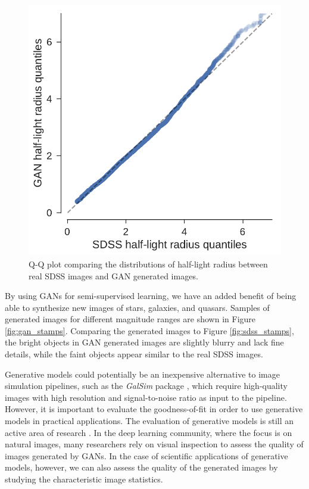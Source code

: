 \documentclass[fleqn,usenatbib]{mnras}
\begin{document}
\begin{figure}
  \centering
  \includegraphics[width=\columnwidth]{figures/size_qq.pdf}
  \caption{Q-Q plot comparing the distributions of half-light radius between real SDSS images and GAN generated images.}
  \label{fig:size_qq}
\end{figure}

By using GANs for semi-supervised learning, we have an added benefit of being able to synthesize
new images of stars, galaxies, and quasars.
Samples of generated images for different magnitude ranges are shown in Figure \ref{fig:gan_stamps}.
Comparing the generated images to Figure \ref{fig:sdss_stamps}, the bright objects in GAN generated images are
slightly blurry and lack fine details, while the faint objects appear similar to the real SDSS images.

Generative models could potentially be an inexpensive alternative to
image simulation pipelines, such as the \textit{GalSim} package \citep{rowe2015galsim},
which require high-quality images with high resolution and signal-to-noise ratio
as input to the pipeline.
However, it is important to evaluate the goodness-of-fit in order to use generative models
in practical applications.
The evaluation of generative models is still an active area of research \citep{theis2016note}.
In the deep learning community, where the focus is on natural images,
many researchers rely on visual inspection to assess the quality of images generated by GANs.
In the case of scientific applications of generative models, however,
we can also assess the quality of the generated images by studying the characteristic image statistics.
\end{document}
